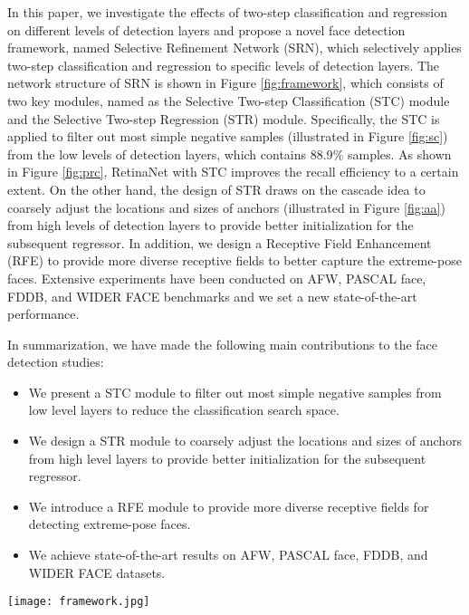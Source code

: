 \documentclass[letterpaper]{article} \usepackage{aaai19m}  \usepackage{times}  \usepackage{helvet}  \usepackage{courier}  \usepackage{url}  \usepackage{graphicx}  \usepackage{subfigure}
\begin{document}
In this paper, we investigate the effects of two-step classification and regression on different levels of detection layers and propose a novel face detection framework, named Selective Refinement Network (SRN), which selectively applies two-step classification and regression to specific levels of detection layers. The network structure of SRN is shown in Figure \ref{fig:framework}, which consists of two key modules, named as the Selective Two-step Classification (STC) module and the Selective Two-step Regression (STR) module. Specifically, the STC is applied to filter out most simple negative samples (illustrated in Figure \ref{fig:sc}) from the low levels of detection layers, which contains $88.9\%$ samples. As shown in Figure \ref{fig:prc}, RetinaNet with STC improves the recall efficiency to a certain extent. On the other hand, the design of STR draws on the cascade idea to coarsely adjust the locations and sizes of anchors (illustrated in Figure \ref{fig:aa}) from high levels of detection layers to provide better initialization for the subsequent regressor. In addition, we design a Receptive Field Enhancement (RFE) to provide more diverse receptive fields to better capture the extreme-pose faces. Extensive experiments have been conducted on AFW, PASCAL face, FDDB, and WIDER FACE benchmarks and we set a new state-of-the-art performance.

In summarization, we have made the following main contributions to the face detection studies:
\begin{itemize}
\item We present a STC module to filter out most simple negative samples from low level layers to reduce the classification search space.
\item We design a STR module to coarsely adjust the locations and sizes of anchors from high level layers to provide better initialization for the subsequent regressor.
\item We introduce a RFE module to provide more diverse receptive fields for detecting extreme-pose faces.
\item We achieve state-of-the-art results on AFW, PASCAL face, FDDB, and WIDER FACE datasets.
\end{itemize}

\begin{figure*}[ht!]
\centering
\texttt{[image: framework.jpg]}
\caption{Network structure of SRN. It consists of STC, STR, and RFB. STC uses the first-step classifier to filter out most simple negative anchors from low level detection layers to reduce the search space for the second-step classifier. STR applies the first-step regressor to coarsely adjust the locations and sizes of anchors from high level detection layers to provide better initialization for the second-step regressor. RFE provides more diverse receptive fields to better capture extreme-pose faces.
}
\label{fig:framework}
\end{figure*}
\end{document}

